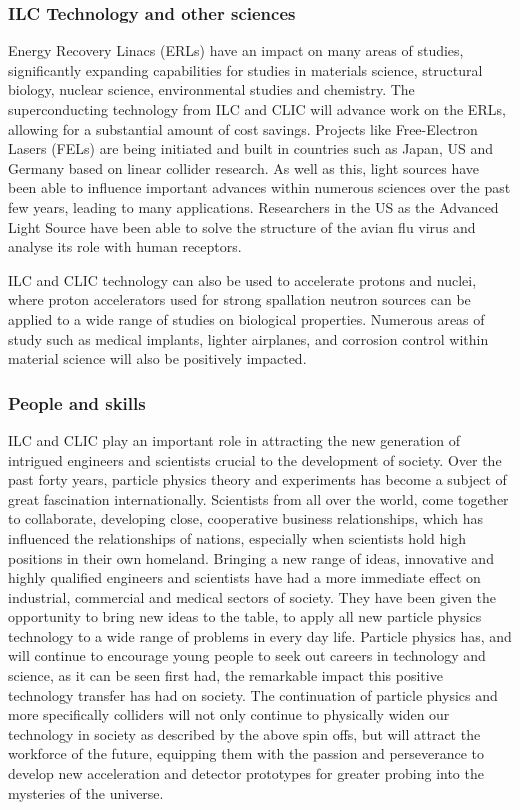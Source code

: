 \subsubsection{ILC Technology and other sciences}

Energy Recovery Linacs (ERLs) have an impact on many areas of studies, significantly expanding capabilities for studies in materials science, structural biology, nuclear science, environmental studies and chemistry. The superconducting technology from ILC and CLIC will advance work on the ERLs, allowing for a substantial amount of cost savings. Projects like Free-Electron Lasers (FELs) are being initiated and built in countries such as Japan, US and Germany based on linear collider research. As well as this, light sources have been able to influence important advances within numerous sciences over the past few years, leading to many applications. Researchers in the US as the Advanced Light Source have been able to solve the structure of the avian flu virus and analyse its role with human receptors.

ILC and CLIC technology can also be used to accelerate protons and nuclei, where proton accelerators used for strong spallation neutron sources can be applied to a wide range of studies on biological properties. Numerous areas of study such as medical implants, lighter airplanes, and corrosion control within material science will also be positively impacted. \cite{ILC:WhyNeed}

\subsubsection{People and skills}

ILC and CLIC play an important role in attracting the new generation of intrigued engineers and scientists crucial to the development of society. Over the past forty years, particle physics theory and experiments has become a subject of great fascination internationally. Scientists from all over the world, come together to collaborate, developing close, cooperative business relationships, which has influenced the relationships of nations, especially when scientists hold high positions in their own homeland. Bringing a new range of ideas, innovative and highly qualified engineers and scientists have had a more immediate effect on industrial, commercial and medical sectors of society. They have been given the opportunity to bring new ideas to the table, to apply all new particle physics technology to a wide range of problems in every day life. Particle physics has, and will continue to encourage young people to seek out careers in technology and science, as it can be seen first had, the remarkable impact this positive technology transfer has had on society. The continuation of particle physics and more specifically colliders will not only continue to physically widen our technology in society as described by the above spin offs, but will attract the workforce of the future, equipping them with the passion and perseverance to develop new acceleration and detector prototypes for greater probing into the mysteries of the universe. \cite{ILC:WhyNeed}

